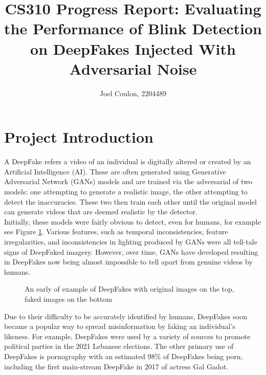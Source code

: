 \documentclass{article}
\title{CS310 Progress Report: Evaluating the Performance of Blink Detection on DeepFakes Injected With Adversarial Noise}
\author{Joel Coulon, 2204489}
\date{}
\begin{document}
\maketitle

\section{Project Introduction}

A DeepFake refers a video of an individual is digitally altered or created by an Artificial Intelligence (AI). These are often generated using Generative Adversarial Network (GANs) models and are trained via the adversarial of two models: one attempting to generate a realistic image, the other attempting to detect the inaccuracies. These two then train each other until the original model can generate videos that are deemed realistic by the detector.\\

Initially, these models were fairly obvious to detect, even for humans, for example see Figure \ref{fig:earlyexample}. Various features, such as temporal inconsistencies, feature irregularities, and inconsistencies in lighting produced by GANs were all tell-tale signs of DeepFaked imagery. However, over time, GANs have developed resulting in DeepFakes now being almost impossible to tell apart from genuine videos by humans.

\begin{figure}[H]
    \centering
    \caption{An early of example of DeepFakes with original images on the top, faked images on the bottom\cite{earlydeepfakeimage}}
    \label{fig:earlyexample}
\end{figure}

Due to their difficulty to be accurately identified by humans, DeepFakes soon became a popular way to spread misinformation by faking an individual's likeness. For example, DeepFakes were used by a variety of sources to promote political parties in the 2021 Lebanese elections\cite{misinformation}. The other primary use of DeepFakes is pornography with an estimated 98\% of DeepFakes being porn\cite{pornography}, including the first main-stream DeepFake in 2017 of actress Gal Gadot\cite{misinformation}.\\
\end{document}
